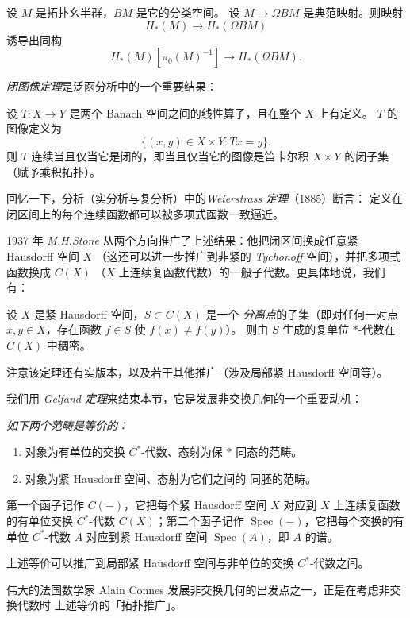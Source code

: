  设 $M$ 是拓扑幺半群，$BM$ 是它的分类空间。
设 $M \to \Omega BM$ 是典范映射。则映射
\[
  H_*(M) \to H_*(\Omega BM)
\]
诱导出同构
\[
  H_*(M)[\pi_0(M)^{-1}] \to H_*(\Omega BM).
\]

\emph{闭图像定理}是泛函分析中的一个重要结果：

 设 $T : X \to Y$ 是两个 Banach 空间之间的线性算子，且在整个 $X$ 上有定义。
$T$ 的图像定义为
\[
  \{(x, y) \in X \times Y : Tx = y\}.
\]
则 $T$ 连续当且仅当它是闭的，即当且仅当它的图像是笛卡尔积 $X \times Y$ 的闭子集
（赋予乘积拓扑）。

回忆一下，分析（实分析与复分析）中的\emph{Weierstrass 定理}（1885）断言：
定义在闭区间上的每个连续函数都可以被多项式函数一致逼近。

1937 年 \emph{M.H.Stone} 从两个方向推广了上述结果：他把闭区间换成任意紧 Hausdorff 空间 $X$
（这还可以进一步推广到非紧的 \emph{Tychonoff} 空间），并把多项式函数换成 $C(X)$
（$X$ 上连续复函数代数）的一般子代数。更具体地说，我们有：

 设 $X$ 是紧 Hausdorff 空间，$S \subset C(X)$ 是一个
\emph{分离点}的子集（即对任何一对点 $x, y \in X$，存在函数 $f \in S$ 使 $f(x) \neq f(y)$）。
则由 $S$ 生成的复单位 $\ast$-代数在 $C(X)$ 中稠密。

注意该定理还有实版本，以及若干其他推广（涉及局部紧 Hausdorff 空间等）。

我们用 \emph{Gelfand 定理}来结束本节，它是发展非交换几何的一个重要动机：

 \emph{如下两个范畴是等价的：}
\begin{enumerate}[label=\arabic*.]
\item 对象为有单位的交换 $C^*$-代数、态射为保 $\ast$ 同态的范畴。
\item 对象为紧 Hausdorff 空间、态射为它们之间的%
同胚的范畴。
\end{enumerate}

第一个函子记作 $C(-)$，它把每个紧 Hausdorff 空间 $X$ 对应到 $X$ 上连续复函数的有单位交换
$C^*$-代数 $C(X)$；第二个函子记作 $\operatorname{Spec}(-)$，它把每个交换的有单位 $C^*$-代数 $A$
对应到紧 Hausdorff 空间 $\operatorname{Spec}(A)$，即 $A$ 的谱。

上述等价可以推广到局部紧 Hausdorff 空间与非单位的交换 $C^*$-代数之间。

伟大的法国数学家 Alain Connes 发展非交换几何的出发点之一，正是在考虑非交换代数时
上述等价的「拓扑推广」。

